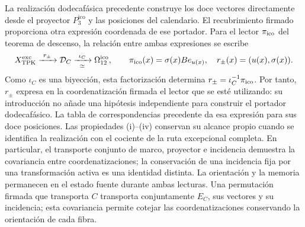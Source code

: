 La realización dodecafásica precedente construye los doce vectores
directamente desde el proyector \(P_3^{\mathrm{ico}}\) y las posiciones del calendario.
El recubrimiento firmado proporciona otra expresión coordenada de ese
portador. Para el lector \(\pi_{\rm ico}\) del teorema de descenso,
la relación entre ambas expresiones se escribe
\begin{equation}
 X_{\rm TPK}^{\rm exc}\xrightarrow{\ r_\pm\ }
 \mathcal D_C\xrightarrow[\simeq]{\ \iota_C\ }
 \Omega_{12}^{\rm ico},\qquad
 \pi_{\rm ico}(x)=\sigma(x)Be_{u(x)},\quad
 r_\pm(x)=(u(x),\sigma(x)).
 \label{ii:ico:factorizacion-lector}
\end{equation}
Como \(\iota_C\) es una biyección, esta factorización determina
\(r_\pm=\iota_C^{-1}\pi_{\rm ico}\). Por tanto, \(r_\pm\) expresa
en la coordenatización firmada el lector que se esté utilizando: su introducción
no añade una hipótesis independiente para construir el portador
dodecafásico. La tabla de correspondencias precedente da esa expresión
para sus doce posiciones. Las propiedades (i)--(iv) conservan su
alcance propio cuando se identifica la realización con el cociente
de la ruta excepcional completa. En particular, el transporte conjunto
de marco, proyector e incidencia demuestra la covariancia entre coordenatizaciones;
la conservación de una incidencia fija por una transformación activa
es una identidad distinta. La orientación y la memoria permanecen
en el estado fuente durante ambas lecturas.
Una permutación firmada que transporta \(C\) transporta conjuntamente
\(E_C\), sus vectores y su incidencia; esta covariancia permite cotejar
las coordenatizaciones conservando la orientación de cada fibra.
